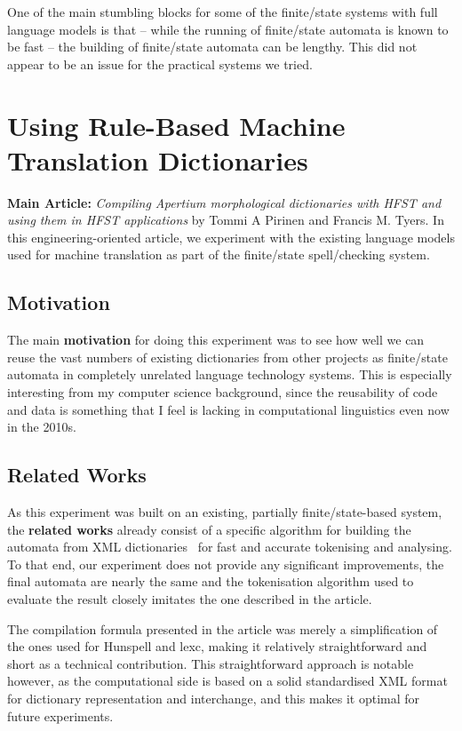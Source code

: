 \documentclass[officiallayout,final]{unihelcompling}
\begin{document}
One of the main stumbling blocks for some of the finite\-/state systems with
full language models is that -- while the running of finite\-/state automata is
known to be fast -- the building of finite\-/state automata can be lengthy. This
did not appear to be an issue for the practical systems we tried.


\section{Using Rule-Based Machine Translation Dictionaries}
\label{sec:apertium}

\textbf{Main Article:} \emph{Compiling Apertium morphological dictionaries with
HFST and using them in HFST applications} by Tommi A Pirinen and Francis M.
Tyers. In this engineering-oriented article, we experiment with the existing
language models used for machine translation as part of the finite\-/state
spell\-/checking system.

\subsection{Motivation}

The main \textbf{motivation} for doing this experiment was to see how well we
can reuse the vast numbers of existing dictionaries from other projects as
finite\-/state automata in completely unrelated language technology systems.
This is especially interesting from my computer science background, since
the reusability of code and data is something that I feel is lacking in
computational linguistics even now in the 2010s.

\subsection{Related Works}

As this experiment was built on an existing, partially finite\-/state-based
system, the \textbf{related works} already consist of a specific algorithm for
building the automata from XML dictionaries~\citep{rojas2005construccion}
for fast and accurate tokenising and analysing. To that end, our
experiment does not provide any significant improvements, the final automata
are nearly the same and the tokenisation algorithm used to evaluate the result
closely imitates the one described in the article.

The compilation formula presented in the article was merely a simplification of
the ones used for Hunspell and lexc, making it relatively straightforward and
short as a technical contribution. This straightforward approach is notable
however, as the computational side is based on a solid standardised XML
format for dictionary representation and interchange, and this makes it optimal
for future experiments.
\end{document}
